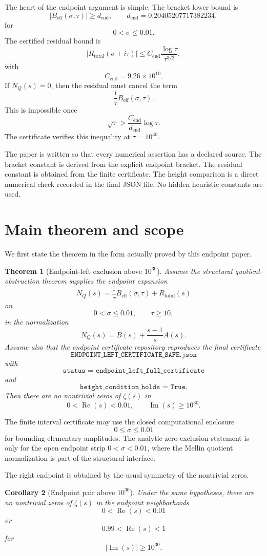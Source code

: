 \documentclass[11pt]{article}
\newtheorem{theorem}{Theorem}[section]
\newtheorem{corollary}[theorem]{Corollary}
\DeclareMathOperator{\Rea}{Re}
\DeclareMathOperator{\Ima}{Im}
\newcommand{\NQ}{N_Q}
\newcommand{\Beff}{B_{\mathrm{eff}}}
\newcommand{\Rtot}{R_{\mathrm{total}}}
\newcommand{\Cend}{C_{\mathrm{end}}}
\newcommand{\dend}{d_{\mathrm{end}}}
\newcommand{\ii}{\mathrm{i}}
\begin{document}
The heart of the endpoint argument is simple.  The bracket lower bound is
\[
|\Beff(\sigma,\tau)|\geq \dend,
\qquad
\dend=0.20405207717382234,
\]
for
\[
0< \sigma\leq 0.01.
\]
The certified residual bound is
\[
|\Rtot(\sigma+i\tau)|
\leq
\Cend\frac{\log\tau}{\tau^{3/2}},
\]
with
\[
\Cend
=
9.26\times10^{10}.
\]
If \(\NQ(s)=0\), then the residual must cancel the term
\[
        \frac{\ii}{\tau}\Beff(\sigma,\tau).
\]  This is impossible once
\[
\sqrt{\tau}>
\frac{\Cend}{\dend}\log\tau.
\]
The certificate verifies this inequality at \(\tau=10^{30}\).

The paper is written so that every numerical assertion has a declared source.  The bracket constant is derived from the explicit endpoint bracket.  The residual constant is obtained from the finite certificate.  The height comparison is a direct numerical check recorded in the final JSON file.  No hidden heuristic constants are used.

\section{Main theorem and scope}

We first state the theorem in the form actually proved by this endpoint paper.

\begin{theorem}[Endpoint-left exclusion above \(10^{30}\)]
Assume the structural quotient-obstruction theorem supplies the endpoint expansion
\[
\NQ(s)=\frac{\ii}{\tau}\Beff(\sigma,\tau)+\Rtot(s)
\]
on
\[
0< \sigma\leq 0.01,
\qquad
\tau\geq 10,
\]
in the normalization
\[
\NQ(s)=B(s)+\frac{s-1}{s}A(s).
\]
Assume also that the endpoint certificate repository reproduces the final certificate
\[
\texttt{ENDPOINT\_LEFT\_CERTIFICATE\_SAFE.json}
\]
with
\[
\texttt{status = endpoint\_left\_full\_certificate}
\]
and
\[
\texttt{height\_condition\_holds = True}.
\]
Then there are no nontrivial zeros of \(\zeta(s)\) in
\[
0<\Rea(s)<0.01,
\qquad
\Ima(s)\geq 10^{30}.
\]
\end{theorem}

The finite interval certificate may use the closed computational enclosure
\[
0\le\sigma\le0.01
\]
for bounding elementary amplitudes.  The analytic zero-exclusion statement is
only for the open endpoint strip \(0<\sigma<0.01\), where the Mellin quotient
normalization is part of the structural interface.

The right endpoint is obtained by the usual symmetry of the nontrivial zeros.

\begin{corollary}[Endpoint pair above \(10^{30}\)]
Under the same hypotheses, there are no nontrivial zeros of \(\zeta(s)\) in the endpoint neighborhoods
\[
0<\Rea(s)<0.01
\]
or
\[
0.99<\Rea(s)<1
\]
for
\[
|\Ima(s)|\geq 10^{30}.
\]
\end{corollary}
\end{document}
